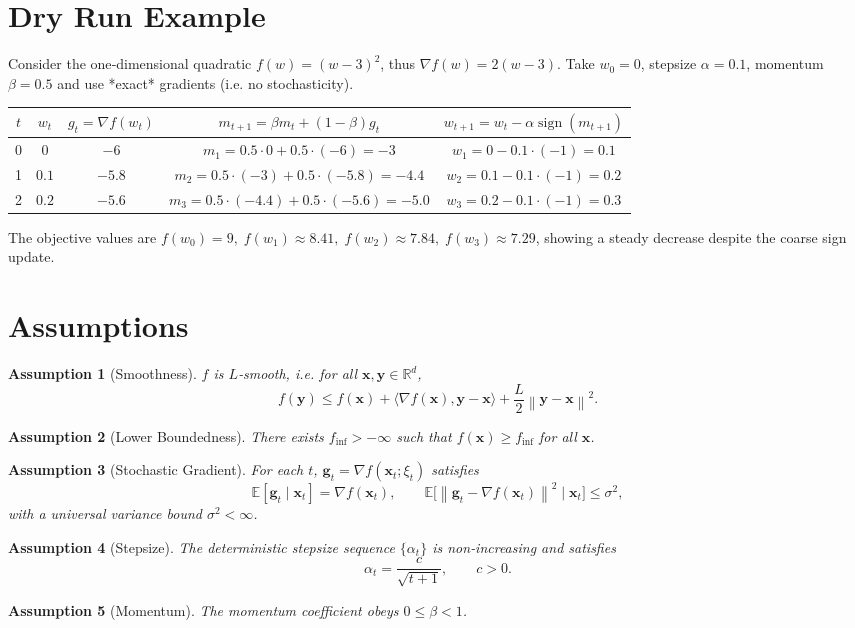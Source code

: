 \documentclass[11pt]{article}
\newtheorem{assumption}{Assumption}
\newcommand{\E}{\mathbb{E}}
\newcommand{\R}{\mathbb{R}}
\newcommand{\sign}{\operatorname{sign}}
\newcommand{\norm}[1]{\left\lVert#1\right\rVert}
\newcommand{\ip}[2]{\langle #1,#2\rangle}
\begin{document}
\section*{Dry Run Example}
Consider the one‑dimensional quadratic $f(w)=(w-3)^{2}$, thus $\nabla f(w)=2(w-3)$.  
Take $w_{0}=0$, stepsize $\alpha=0.1$, momentum $\beta=0.5$ and use *exact* gradients (i.e. no stochasticity).

\begin{center}
\begin{tabular}{c|c|c|c|c}
$t$ & $w_{t}$ & $g_{t}= \nabla f(w_{t})$ & $m_{t+1}= \beta m_{t}+(1-\beta)g_{t}$ & $w_{t+1}= w_{t}-\alpha\sign(m_{t+1})$\\ \hline
0 & $0$ & $-6$ & $m_{1}=0.5\cdot0+0.5\cdot(-6)=-3$ & $w_{1}=0-0.1\cdot(-1)=0.1$\\
1 & $0.1$ & $-5.8$ & $m_{2}=0.5\cdot(-3)+0.5\cdot(-5.8)=-4.4$ & $w_{2}=0.1-0.1\cdot(-1)=0.2$\\
2 & $0.2$ & $-5.6$ & $m_{3}=0.5\cdot(-4.4)+0.5\cdot(-5.6)=-5.0$ & $w_{3}=0.2-0.1\cdot(-1)=0.3$
\end{tabular}
\end{center}
The objective values are $f(w_{0})=9,\;f(w_{1})\approx8.41,\;f(w_{2})\approx7.84,\;f(w_{3})\approx7.29$, showing a steady decrease despite the coarse sign update.

\newpage
\section*{Assumptions}
\begin{assumption}[Smoothness]\label{ass:smooth}
$f$ is $L$‑smooth, i.e. for all $\bm{x},\bm{y}\in\R^{d}$,
\[
f(\bm{y})\le f(\bm{x})+\ip{\nabla f(\bm{x})}{\bm{y}-\bm{x}}+\frac{L}{2}\norm{\bm{y}-\bm{x}}^{2}.
\]
\end{assumption}
\begin{assumption}[Lower Boundedness]\label{ass:lb}
There exists $f_{\inf}>-\infty$ such that $f(\bm{x})\ge f_{\inf}$ for all $\bm{x}$.
\end{assumption}
\begin{assumption}[Stochastic Gradient]\label{ass:sg}
For each $t$, $\bm{g}_{t}=\nabla f(\bm{x}_{t};\xi_{t})$ satisfies
\[
\E[\bm{g}_{t}\mid\bm{x}_{t}]=\nabla f(\bm{x}_{t}),\qquad
\E\big[\norm{\bm{g}_{t}-\nabla f(\bm{x}_{t})}^{2}\mid\bm{x}_{t}\big]\le\sigma^{2},
\]
with a universal variance bound $\sigma^{2}<\infty$.
\end{assumption}
\begin{assumption}[Stepsize]\label{ass:stepsize}
The deterministic stepsize sequence $\{\alpha_{t}\}$ is non‑increasing and satisfies
\[
\alpha_{t}=\frac{c}{\sqrt{t+1}},\qquad c>0.
\]
\end{assumption}
\begin{assumption}[Momentum]\label{ass:beta}
The momentum coefficient obeys $0\le\beta<1$.
\end{assumption}
\end{document}
